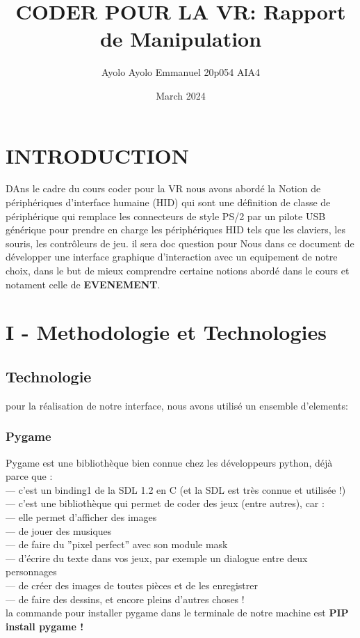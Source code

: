 \documentclass{article}
\title{CODER POUR LA VR: Rapport de Manipulation}
\author{Ayolo Ayolo Emmanuel 20p054 AIA4}
\date{March 2024}
\begin{document}
\maketitle

\section{INTRODUCTION }
DAns le cadre du cours coder pour la VR nous avons abordé la Notion de  périphériques d’interface humaine (HID) qui sont une définition de classe de périphérique qui remplace les connecteurs de style PS/2 par un pilote USB générique pour prendre en charge les périphériques HID tels que les claviers, les souris, les contrôleurs de jeu. il sera doc question pour Nous dans ce document de développer une interface graphique d'interaction avec un equipement de notre choix, dans le but de mieux comprendre certaine notions abordé dans le cours et notament celle de \textbf{EVENEMENT}.

\section{I - Methodologie et Technologies  }
\subsection {Technologie}
pour la réalisation de notre interface, nous avons utilisé un ensemble d'elements:
\subsubsection {Pygame}

Pygame  est une bibliothèque bien connue chez les développeurs python, déjà parce que :\\
— c’est un binding1 de la SDL 1.2 en C (et la SDL est très connue et utilisée !)\\
— c’est une bibliothèque qui permet de coder des jeux (entre autres), car :\\
— elle permet d’afficher des images\\
— de jouer des musiques\\
— de faire du ”pixel perfect” avec son module mask\\
— d’écrire du texte dans vos jeux, par exemple un dialogue entre deux personnages\\
— de créer des images de toutes pièces et de les enregistrer\\
— de faire des dessins, et encore pleins d’autres choses !\\ 
la commande pour installer pygame dans le terminale de notre  machine est \textbf{PIP install pygame !}
\end{document}
